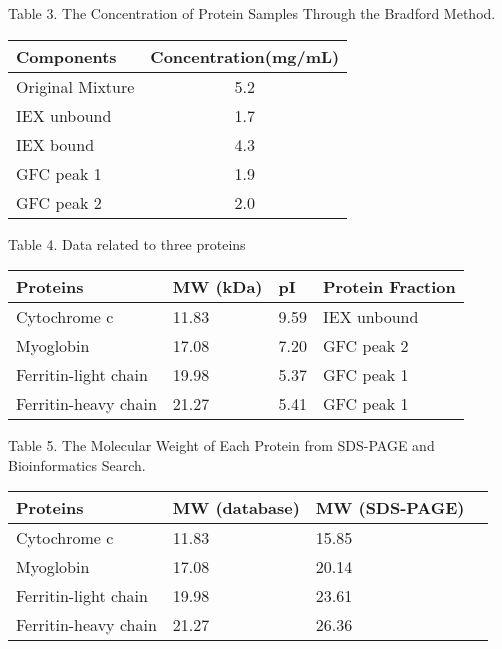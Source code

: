 \documentclass[a4paper,10pt]{article}
\begin{document}
\begin{multicols}{2}
\begin{center}
{Table 3. The Concentration of Protein Samples Through the Bradford Method.}
\vspace{0pt}
\begin{table}[H]
\setlength{\tabcolsep}{5pt}
\begin{tabular}{lc}
\toprule [1pt]
Components&Concentration(mg/mL)\\
\hline
Original Mixture & 5.2\\
IEX unbound & 1.7 \\
IEX bound & 4.3 \\
GFC peak 1 & 1.9 \\
GFC peak 2 & 2.0\\
\bottomrule [1pt]
\end{tabular}
\end{table}
\end{center}


\begin{center}
{Table 4. Data related to three proteins}
\vspace{0pt}
\begin{table}[H]
\setlength{\tabcolsep}{5pt}
\footnotesize
\begin{tabular}{llll}
\toprule [1pt]
Proteins&MW (kDa)& pI & Protein Fraction\\
\hline
Cytochrome c & 11.83 & 9.59 & IEX unbound\\
Myoglobin & 17.08 & 7.20 & GFC peak 2\\
Ferritin-light chain & 19.98 & 5.37 & GFC peak 1\\
Ferritin-heavy chain & 21.27 & 5.41 & GFC peak 1\\
\bottomrule [1pt]
\end{tabular}
\end{table}
\end{center}



\begin{center}
{Table 5. The Molecular Weight of Each Protein from SDS-PAGE and Bioinformatics Search.}
\vspace{0pt}
\begin{table}[H]
\setlength{\tabcolsep}{5pt}
\footnotesize
\begin{tabular}{llll}
\toprule [1pt]
Proteins&MW (database)&MW (SDS-PAGE)\\
\hline
Cytochrome c & 11.83 & 15.85\\
Myoglobin & 17.08 & 20.14\\
Ferritin-light chain & 19.98 & 23.61\\
Ferritin-heavy chain & 21.27 & 26.36\\
\bottomrule [1pt]
\end{tabular}
\end{table}
\end{center}
\fi




\end{multicols}
\end{document}
